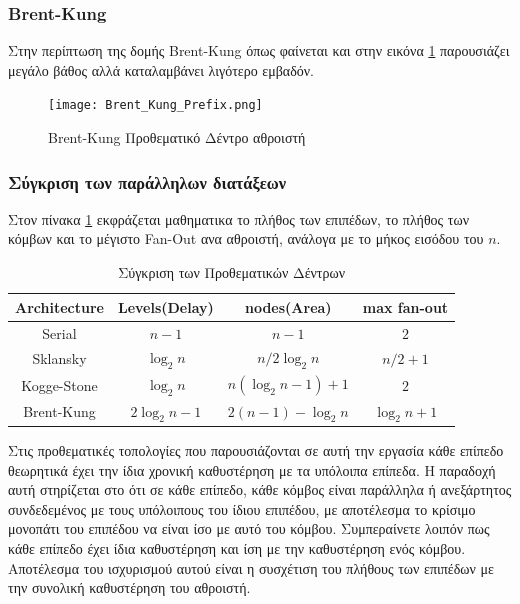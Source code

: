 \subsubsection*{Brent-Kung}
Στην περίπτωση της δομής Brent-Kung \cite{Brent:1982:RLP:1309296.1309891}
όπως φαίνεται και στην εικόνα \ref{BrentKungTree} παρουσιάζει μεγάλο βάθος αλλά καταλαμβάνει
λιγότερο εμβαδόν.
\begin{figure}[H]
    \centering
    \texttt{[image: Brent\_Kung\_Prefix.png]}
    \caption{Brent-Kung Προθεματικό Δέντρο αθροιστή}
    \label{BrentKungTree}
\end{figure}




\subsubsection*{Σύγκριση των παράλληλων διατάξεων}

Στον πίνακα \ref{Prefix_Comparison} εκφράζεται μαθηματικα το πλήθος των επιπέδων, το πλήθος των 
κόμβων και το μέγιστο Fan-Out ανα αθροιστή, ανάλογα με το μήκος εισόδου του $n$.
\begin{table}[H]
\centering
     \begin{tabular}{  c c c c  } 

        \hline
        Architecture & Levels(Delay) & nodes(Area) & max fan-out\\
        \hline
        
        Serial &
        $n-1$ &
        $n-1$ &
        $2$\\
        
        Sklansky &
        $\log_2 n$ &
        $n/2\log_2n$ &
        $n/2+1$\\
        
        Kogge-Stone &
        $\log_2n$ &
        $n(\log_2n-1)+1$ &
        $2$\\
        
        Brent-Kung &
        $2\log_2n-1$ &
        $ 2(n-1) - \log_2n $ &
        $\log_2n+1$\\
        
        \hline

    \end{tabular}

\caption{Σύγκριση των Προθεματικών Δέντρων}
\label{Prefix_Comparison}
\end{table}
Στις προθεματικές τοπολογίες που παρουσιάζονται σε αυτή την εργασία κάθε επίπεδο θεωρητικά έχει 
την ίδια χρονική καθυστέρηση με τα υπόλοιπα επίπεδα. Η παραδοχή αυτή στηρίζεται στο ότι 
σε κάθε επίπεδο, κάθε κόμβος είναι παράλληλα ή ανεξάρτητος συνδεδεμένος με τους υπόλοιπους
του ίδιου επιπέδου, με αποτέλεσμα το κρίσιμο μονοπάτι του επιπέδου να είναι ίσο με αυτό του
κόμβου. Συμπεραίνετε λοιπόν πως κάθε επίπεδο έχει ίδια καθυστέρηση και ίση με την καθυστέρηση
ενός κόμβου. Αποτέλεσμα του ισχυρισμού αυτού είναι η συσχέτιση του πλήθους των επιπέδων με 
την συνολική καθυστέρηση του αθροιστή.

